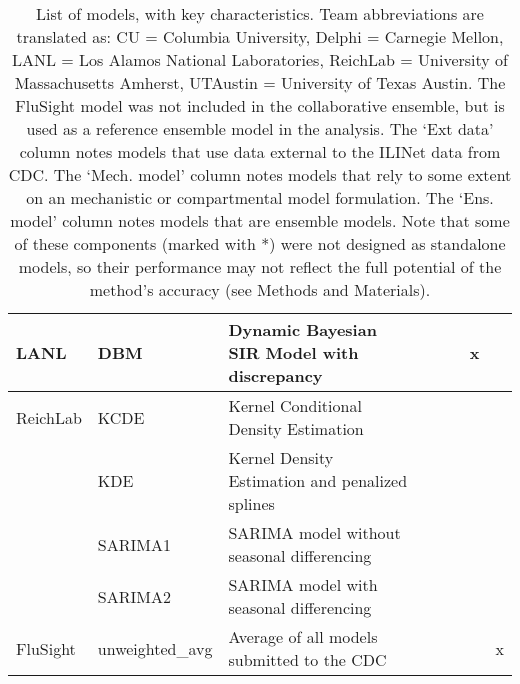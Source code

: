 \begin{table*}
\begin{tabular}{p{1.6cm} l p{7.5cm} l  p{1cm}  p{1cm} p{1cm}}
\hline
LANL     & DBM                & Dynamic Bayesian SIR Model with discrepancy & \cite{osthus2018dynamic} & ~             & x      &              \\ 
\hline
ReichLab & KCDE               & Kernel Conditional Density Estimation & \cite{Ray2017}  & ~             & ~            &        \\ 
~        & KDE                & Kernel Density Estimation and penalized splines & \cite{Ray2018}  & ~             & ~     &               \\ 
~        & SARIMA1            & SARIMA model without seasonal differencing & \cite{Ray2018} & ~             & ~      &              \\ 
~        & SARIMA2            & SARIMA model with seasonal differencing & \cite{Ray2018} & ~             & ~           &         \\ 
\hline
FluSight & unweighted\_avg       & Average of all models submitted to the CDC & \cite{McGowan2018}  &   &  &  x\\
\end{tabular}
\caption{List of models, with key characteristics. Team abbreviations are translated as: CU = Columbia University, Delphi = Carnegie Mellon, LANL = Los Alamos National Laboratories, ReichLab = University of Massachusetts Amherst, UTAustin = University of Texas Austin. The FluSight model was not included in the collaborative ensemble, but is used as a reference ensemble model in the analysis. The `Ext data' column notes models that use data external to the ILINet data from CDC. The `Mech. model' column notes models that rely to some extent on an mechanistic or compartmental model formulation. The `Ens. model' column notes models that are ensemble models. Note that some of these components (marked with *) were not designed as standalone models, so their performance may not reflect the full potential of the method's accuracy (see Methods and Materials).}
\label{tab:model-list}
\end{table*}